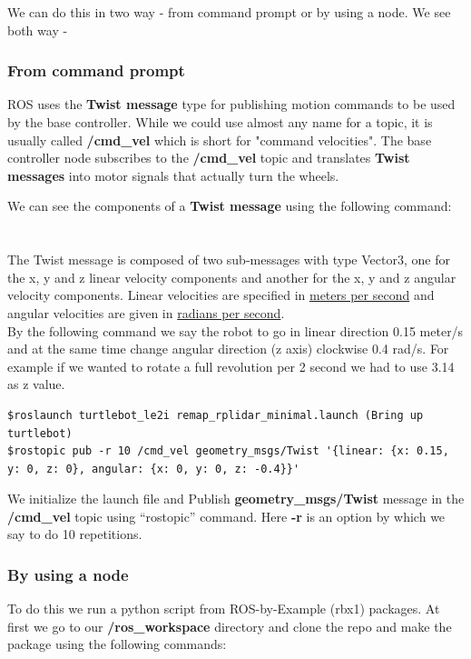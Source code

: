 \documentclass[10pt,a4paper]{article}
\begin{document}
We can do this in two way - from command prompt or by using a node. We see both way - 
\subsubsection{From command prompt}
ROS uses the \textbf{Twist message} type for publishing motion commands to be used by the base controller. While we could use almost any name for a topic, it is usually called \textbf{/cmd\_vel} which is short for "command velocities". The base controller node subscribes to the \textbf{/cmd\_vel} topic and translates \textbf{Twist messages} into motor signals that actually turn the wheels.

We can see the components of a \textbf{Twist message} using the following command:\\\\
\\

The Twist message is composed of two sub-messages with type Vector3, one for the x, y and z linear velocity components and another for the x, y and z angular velocity components. Linear velocities are specified in \underline{meters per second} and angular velocities are given in \underline{radians per second}.\\

By the following command we say the robot to go in linear direction 0.15 meter/s and at the same time change angular direction (z axis) clockwise 0.4 rad/s. For example if we wanted to rotate a full revolution per 2 second we had to use 3.14 as z value.
\begin{lstlisting}[frame=single] 
$roslaunch turtlebot_le2i remap_rplidar_minimal.launch (Bring up turtlebot)
$rostopic pub -r 10 /cmd_vel geometry_msgs/Twist '{linear: {x: 0.15, y: 0, z: 0}, angular: {x: 0, y: 0, z: -0.4}}'
\end{lstlisting}
We initialize the launch file and Publish \textbf{geometry\_msgs/Twist} message in the \textbf{/cmd\_vel} topic using ``rostopic'' command. Here \textbf{-r} is an option by which we say to do 10 repetitions.

\subsubsection{By using a node}
To do this we run a python script from ROS-by-Example (rbx1) packages. At first we go to our \textbf{/ros\_workspace} directory and clone the repo and make the package using the following commands:
\end{document}
